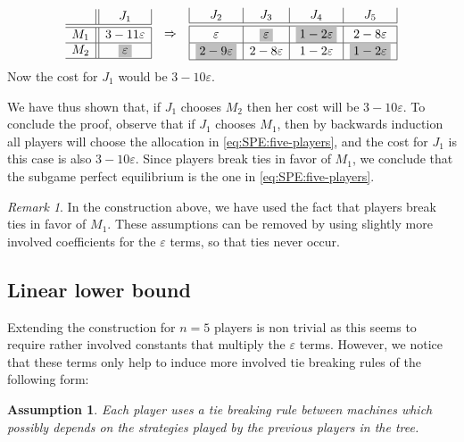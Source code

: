 \documentclass[12pt,a4paper]{article}
\newcommand{\pp}[1]{\todo[color=blue!40!white]{\scriptsize Pao: #1}}
\newtheorem{assumption}[lemma]{Assumption}
\theoremstyle{definition}
\theoremstyle{remark}
\newtheorem{remark}[lemma]{Remark}
\newcommand{\take}[1]{\colorbox{emphcol}{$#1$}}
\renewcommand{\epsilon}{\varepsilon}
\begin{document}
\begin{enumerate}
			\begin{align*}\begin{array}{c||c|}
			& J_1   \\ \hline \hline
			M_1 & 3-11\epsilon  \\ \hline 
			M_2 & \take{\epsilon}  \\ \hline
			\end{array} &&
			\Rightarrow &&
			\begin{array}{|c|c|c|c|}
			J_2 & J_3 &	J_4 & J_5 \\ \hline\hline
			\epsilon   & \take{\epsilon} & \take{1-2\epsilon }& 2-8\epsilon \\ \hline
			 \take{2-9\epsilon}  & 2-8\epsilon & 1-2\epsilon & \take{1-2\epsilon} \\ \hline
			\end{array}
			\end{align*} 
			Now the cost for $J_1$ would be $3 - 10\epsilon$.
	\end{enumerate}
	We have thus shown that, if $J_1$ chooses $M_2$ then her cost will be $3 - 10\epsilon$.  To conclude the proof, observe that if $J_1$ chooses $M_1$, then by backwards induction all players will choose the allocation in \eqref{eq:SPE:five-players}, and the cost for $J_1$ is this case is also $3  - 10 \epsilon$. Since players break ties in favor of $M_1$, we conclude that the  subgame perfect equilibrium is the one in \eqref{eq:SPE:five-players}.

\begin{remark}
	In the construction above, we have used the fact that players break ties in favor of $M_1$. These assumptions can be removed by using slightly more involved coefficients for the $\epsilon$ terms, so that ties never occur.
\end{remark}

\subsection{Linear lower bound}
Extending  the construction for $n=5$ players is non trivial as this seems to require rather involved constants that multiply the $\epsilon$ terms. However, we notice that these terms only help to induce more involved tie breaking rules of the following form:

\begin{assumption}
	Each player uses a tie breaking rule between machines which possibly depends on the strategies played by the previous players in the tree.  %
\end{assumption}
\end{document}
